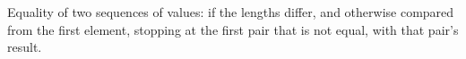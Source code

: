 Equality of two sequences of values:  if the lengths differ, and otherwise compared from the first element, stopping at the first pair that is not equal, with that pair's result.
